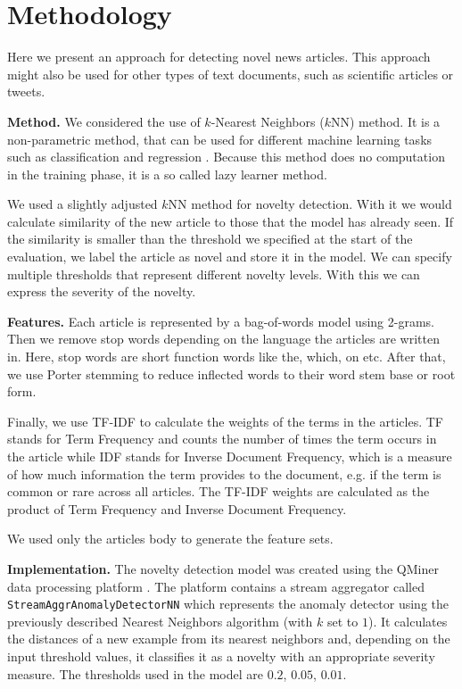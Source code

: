 \documentclass{acm_proc_article-sp}
\begin{document}
\section{Methodology}\label{section:methodology}
Here we present an approach for detecting novel news articles. This approach might also be used for other types of text documents, such as scientific articles or tweets.

\textbf{Method.}
We considered the use of $k$-Nearest Neighbors ($k$NN) method. It is a non-parametric method, that can be used for different machine learning tasks such as classification and regression \cite{altman1992knn}. Because this method does no computation in the training phase, it is a so called lazy learner method. 

We used a slightly adjusted $k$NN method for novelty detection. With it we would calculate similarity of the new article to those that the model has already seen. If the similarity is smaller than the threshold we specified at the start of the evaluation, we label the article as novel and  store it in the model. We can specify multiple thresholds that represent different novelty levels. With this we can express the severity of the novelty.


\textbf{Features.}
Each article is represented by a bag-of-words model using 2-grams.
Then we remove stop words depending on the language the articles are written in. Here, stop words are short function words like the, which, on etc.
After that, we use Porter stemming to reduce inflected words to their word stem base or root form.

Finally, we use TF-IDF to calculate the weights of the terms in the articles. TF stands for Term Frequency and counts the number of times the term occurs in the article while IDF stands for Inverse Document Frequency, which is a measure of how much information the term provides to the document, e.g. if the term is common or rare across all articles. The TF-IDF weights are calculated as the product of Term Frequency and Inverse Document Frequency. 

We used only the articles body to generate the feature sets. 

\textbf{Implementation.}
The novelty detection model was created using the QMiner data processing platform \cite{qminer}. The platform contains a stream aggregator called 
\texttt{StreamAggrAnomalyDetectorNN} which represents the anomaly detector using the previously described Nearest Neighbors algorithm (with $k$ set to $1$). It calculates the distances of a new example from its nearest neighbors and, depending on the input threshold values, it classifies it as a novelty with an appropriate severity measure. The thresholds used in the model are $0.2$, $0.05$, $0.01$.
\end{document}
